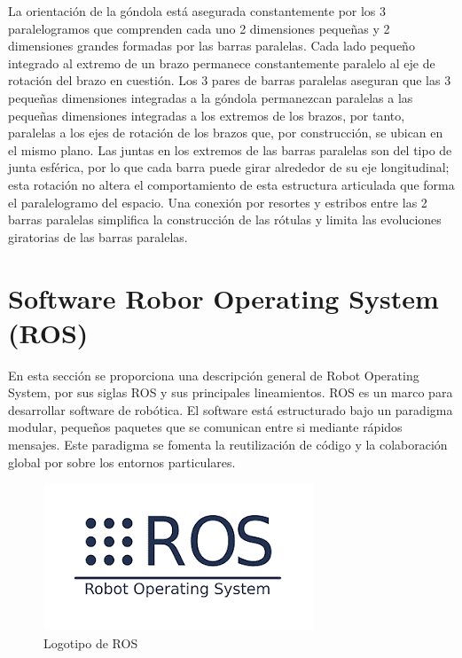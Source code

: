     La orientación de la góndola está asegurada constantemente por los 3 paralelogramos que comprenden cada uno 2 dimensiones pequeñas y 2 dimensiones grandes formadas por las barras paralelas. Cada lado pequeño integrado al extremo de un brazo permanece constantemente paralelo al eje de rotación del brazo en cuestión. Los 3 pares de barras paralelas aseguran que las 3 pequeñas dimensiones integradas a la góndola permanezcan paralelas a las pequeñas dimensiones integradas a los extremos de los brazos, por tanto, paralelas a los ejes de rotación de los brazos que, por construcción, se ubican en el mismo plano. Las juntas en los extremos de las barras paralelas son del tipo de junta esférica, por lo que cada barra puede girar alrededor de su eje longitudinal; esta rotación no altera el comportamiento de esta estructura articulada que forma el paralelogramo del espacio. Una conexión por resortes y estribos entre las 2 barras paralelas simplifica la construcción de las rótulas y limita las evoluciones giratorias de las barras paralelas.
    
    \newpage

\section{Software Robor Operating System (ROS)}
    
    En esta sección se proporciona una descripción general de Robot Operating System, por sus siglas ROS y sus principales lineamientos. ROS es un marco para desarrollar software de robótica. El software está estructurado bajo un paradigma modular, pequeños paquetes que se comunican entre si mediante rápidos mensajes. Este paradigma se fomenta la reutilización de código y la colaboración global por sobre los entornos particulares.
    
    \begin{figure}[htb]
        \centering
        \includegraphics[width=0.5\linewidth]{Main/Chapter3/Images3/3-4/logo-ros.png}
        \caption{Logotipo de ROS}
        \label{f:Cap3-4_logo_ros}
    \end{figure}
    
